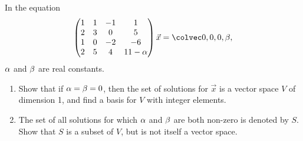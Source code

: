 \begin{problem}
    In the equation \[\begin{pmatrix}1 & 1 & -1 & 1 \\ 2 & 3 & 0 & 5 \\ 1 & 0 & -2 & -6 \\ 2 & 5 & 4 & 11 - \a\end{pmatrix} \vec x = \cveciv000\b,\] $\alpha$ and $\beta$ are real constants.

    \begin{enumerate}
        \item Show that if $\alpha = \beta = 0$, then the set of solutions for $\vec x$ is a vector space $V$ of dimension 1, and find a basis for $V$ with integer elements.
        \item The set of all solutions for which $\alpha$ and $\beta$ are both non-zero is denoted by $S$. Show that $S$ is a subset of $V$, but is not itself a vector space.
    \end{enumerate}
\end{problem}
